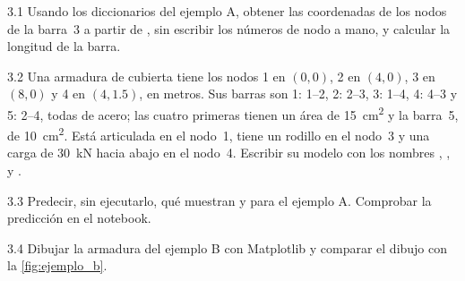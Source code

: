 \ejercicios

\begin{ejercicio}{3.1}
Usando los diccionarios del ejemplo A, obtener las coordenadas de los nodos
de la barra~3 a partir de , sin escribir los números de nodo a
mano, y calcular la longitud de la barra.
\end{ejercicio}

\begin{ejercicio}{3.2}
Una armadura de cubierta tiene los nodos 1 en $(0, 0)$, 2 en $(4, 0)$, 3 en
$(8, 0)$ y 4 en $(4, 1.5)$, en metros. Sus barras son 1: 1--2, 2: 2--3,
3: 1--4, 4: 4--3 y 5: 2--4, todas de acero; las cuatro primeras tienen un área
de \SI{15}{\centi\metre\squared} y la barra~5, de
\SI{10}{\centi\metre\squared}. Está articulada en el nodo~1, tiene un rodillo
en el nodo~3 y una carga de \SI{30}{\kilo\newton} hacia abajo en el nodo~4.
Escribir su modelo con los nombres , ,
 y .
\end{ejercicio}

\begin{ejercicio}{3.3}
Predecir, sin ejecutarlo, qué muestran  y
 para el ejemplo A. Comprobar la predicción en
el notebook.
\end{ejercicio}

\begin{ejercicio}{3.4}
Dibujar la armadura del ejemplo B con Matplotlib y comparar el dibujo con la
\cref{fig:ejemplo_b}.
\end{ejercicio}

